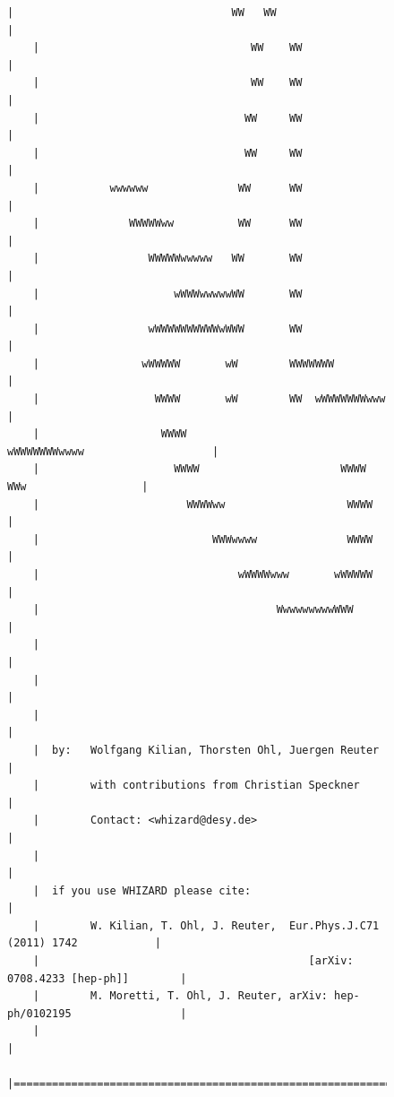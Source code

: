 \documentclass[12pt]{book}
\begin{document}
\begin{figure}
\begin{scriptsize}
\begin{Verbatim}[frame=single]
    |                                  WW   WW                                    |
    |                                 WW    WW                                    |
    |                                 WW    WW                                    |
    |                                WW     WW                                    |
    |                                WW     WW                                    |
    |           wwwwww              WW      WW                                    |
    |              WWWWWww          WW      WW                                    |
    |                 WWWWWwwwww   WW       WW                                    |
    |                     wWWWwwwwwWW       WW                                    |
    |                 wWWWWWWWWWWwWWW       WW                                    |
    |                wWWWWW       wW        WWWWWWW                               |
    |                  WWWW       wW        WW  wWWWWWWWwww                       |
    |                   WWWW                      wWWWWWWWwwww                    |
    |                     WWWW                      WWWW     WWw                  |
    |                       WWWWww                   WWWW                         |
    |                           WWWwwww              WWWW                         |
    |                               wWWWWwww       wWWWWW                         |
    |                                     WwwwwwwwwWWW                            |
    |                                                                             |
    |                                                                             |
    |                                                                             |
    |  by:   Wolfgang Kilian, Thorsten Ohl, Juergen Reuter                        |
    |        with contributions from Christian Speckner                           |
    |        Contact: <whizard@desy.de>                                           |
    |                                                                             |
    |  if you use WHIZARD please cite:                                            |
    |        W. Kilian, T. Ohl, J. Reuter,  Eur.Phys.J.C71 (2011) 1742            |
    |                                          [arXiv: 0708.4233 [hep-ph]]        |
    |        M. Moretti, T. Ohl, J. Reuter, arXiv: hep-ph/0102195                 |
    |                                                                             |
    |=============================================================================|

\end{Verbatim}
\end{scriptsize}
\end{figure}
\end{document}
